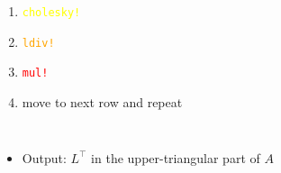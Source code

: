 \documentclass{beamer}
\begin{document}
\begin{frame}
\begin{columns}
\begin{tikzpicture}[thick, scale=1, transform shape]
   \end{tikzpicture}
    
    \begin{enumerate}
      \item<2-> \textcolor{yellow}{\texttt{cholesky!}}
      \item<3-> \textcolor{orange}{\texttt{ldiv!}}
      \item<4-> \textcolor{red}{\texttt{mul!}}
      \item<5-> move to next row and repeat
    \end{enumerate}
  \end{columns}
  
  \bigskip
  \begin{itemize}  
    \item<6-> Output: $L^\top$ in the upper-triangular part of $A$
  \end{itemize}

\end{frame}
\end{document}
